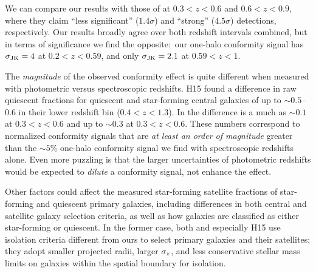 We can compare our results with those of \citet{Kawinwanichakij16} at ${0.3<z<0.6}$ and ${0.6<z<0.9}$, where they claim 
``less significant'' ($1.4\sigma$) and ``strong'' ($4.5\sigma$) detections, respectively.
Our results broadly agree over both redshift intervals combined, but in terms of significance we find the opposite:~our one-halo conformity signal has ${\sigmaJK=4}$ at ${0.2<z<0.59}$, and only ${\sigmaJK=2.1}$ at ${0.59<z<1}$.

The \emph{magnitude} of the observed conformity effect is quite different when measured with photometric versus spectroscopic redshifts.
H15 found a difference in raw quiescent fractions for quiescent and star-forming central galaxies of up to $\sim0.5$--0.6 in their lower redshift bin ($0.4<z<1.3$).
In \citet{Kawinwanichakij16} the difference is a much as $\sim0.1$ at ${0.3<z<0.6}$ and up to $\sim0.3$ at ${0.3<z<0.6}$.
These numbers correspond to normalized conformity signals that are \emph{at least an order of magnitude} greater than the $\sim5$\% one-halo conformity signal we find with spectroscopic redshifts alone.
Even more puzzling is that the larger uncertainties of photometric redshifts would be expected to \emph{dilute} a conformity signal, not enhance the effect.

Other factors could affect the measured star-forming satellite fractions of star-forming and quiescent primary galaxies, including differences in both central and satellite galaxy selection criteria, as well as how galaxies are classified as either star-forming or quiescent.
In the former case, both \citet{Kawinwanichakij16} and especially H15 use isolation criteria different from ours to select primary galaxies and their satellites; they adopt smaller projected radii, larger $\sigmaz$, and less conservative stellar mass limits on galaxies within the spatial boundary for isolation.

